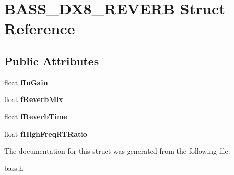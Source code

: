 \hypertarget{structBASS__DX8__REVERB}{}\section{B\+A\+S\+S\+\_\+\+D\+X8\+\_\+\+R\+E\+V\+E\+R\+B Struct Reference}
\label{structBASS__DX8__REVERB}
\subsection*{Public Attributes}
\begin{DoxyCompactItemize}
\item 
\hypertarget{structBASS__DX8__REVERB_a3e6c02bdd61a3fae050c6a7f9318edd6}{}float {\bfseries f\+In\+Gain}\label{structBASS__DX8__REVERB_a3e6c02bdd61a3fae050c6a7f9318edd6}

\item 
\hypertarget{structBASS__DX8__REVERB_aaf55c48b1628fde8c6834fa5a223d807}{}float {\bfseries f\+Reverb\+Mix}\label{structBASS__DX8__REVERB_aaf55c48b1628fde8c6834fa5a223d807}

\item 
\hypertarget{structBASS__DX8__REVERB_adb97abb30a9a52c71e7a01d0b1c9b597}{}float {\bfseries f\+Reverb\+Time}\label{structBASS__DX8__REVERB_adb97abb30a9a52c71e7a01d0b1c9b597}

\item 
\hypertarget{structBASS__DX8__REVERB_ac19b8eddbad1b31e88ac508ccaa08a2d}{}float {\bfseries f\+High\+Freq\+R\+T\+Ratio}\label{structBASS__DX8__REVERB_ac19b8eddbad1b31e88ac508ccaa08a2d}

\end{DoxyCompactItemize}


The documentation for this struct was generated from the following file\+:\begin{DoxyCompactItemize}
\item 
bass.\+h\end{DoxyCompactItemize}
